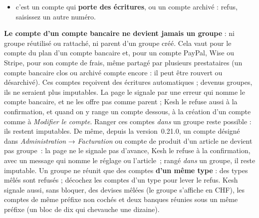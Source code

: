 \documentclass[a4paper,11pt,oneside]{article}
\begin{document}
\begin{enumerate}
\begin{itemize}
        \item c'est un compte qui \textbf{porte des écritures}, ou un compte archivé : refus, saisissez un
        autre numéro.
    \end{itemize}
    \textbf{Le compte d'un compte bancaire ne devient jamais un groupe} : ni groupe réutilisé ou
    rattaché, ni parent d'un groupe créé. Cela vaut pour le compte du plan d'un compte bancaire et,
    pour un compte PayPal, Wise ou Stripe, pour son compte de frais, même partagé par plusieurs
    prestataires (un compte bancaire clos ou archivé compte encore : il peut être rouvert ou désarchivé). Ces comptes
    reçoivent des écritures automatiques ; devenus groupes, ils ne seraient plus imputables. La page
    le signale par une erreur qui nomme le compte bancaire, et ne les offre pas comme parent ; Kesh
    le refuse aussi à la confirmation, et quand on y range un compte dessous, à la création d'un
    compte comme à \emph{Modifier le compte}. Ranger ces comptes \emph{dans} un groupe reste possible : ils restent imputables.
    De même, depuis la version~0.21.0, un compte désigné dans \emph{Administration} →
    \emph{Facturation} ou compte de produit d'un article ne devient pas groupe~: la page ne le
    signale pas d'avance, Kesh le refuse à la confirmation, avec un message qui nomme le réglage ou
    l'article~; rangé \emph{dans} un groupe, il reste imputable.
    Un groupe ne réunit que des comptes \textbf{d'un même type} : des types mêlés sont refusés ;
    décochez les comptes d'un type pour lever le refus. Kesh signale aussi, sans bloquer, des devises
    mêlées (le groupe s'affiche en CHF), les comptes de même préfixe non cochés et deux banques
    réunies sous un même préfixe (un bloc de dix qui chevauche une dizaine).


\end{enumerate}
\end{document}
